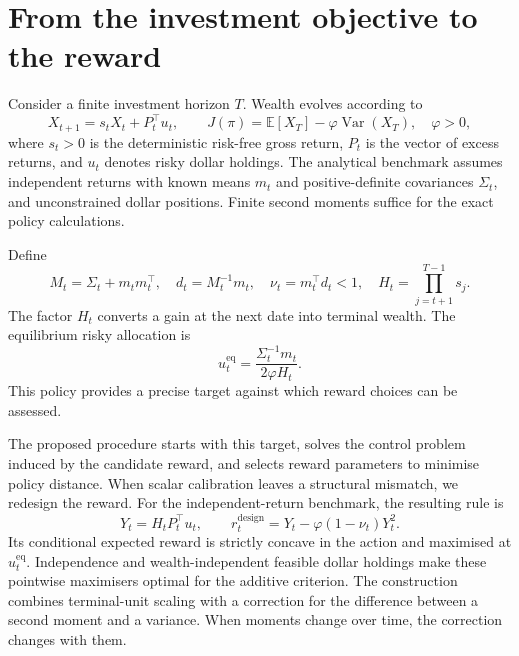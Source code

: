 \documentclass[11pt,a4paper]{article}
\theoremstyle{plain}
\theoremstyle{definition}
\newcommand{\E}{\mathbb{E}}
\newcommand{\Var}{\operatorname{Var}}
\begin{document}
\section{From the investment objective to the reward}
Consider a finite investment horizon $T$. Wealth evolves according to
\begin{equation}
 X_{t+1}=s_tX_t+P_t^{\top}u_t,\qquad
 J(\pi)=\E[X_T]-\varphi\Var(X_T),\quad\varphi>0,
\end{equation}
where $s_t>0$ is the deterministic risk-free gross return, $P_t$ is the vector of excess returns, and $u_t$ denotes risky dollar holdings. The analytical benchmark assumes independent returns with known means $m_t$ and positive-definite covariances $\Sigma_t$, and unconstrained dollar positions. Finite second moments suffice for the exact policy calculations.

Define
\begin{equation}
 M_t=\Sigma_t+m_tm_t^{\top},\quad d_t=M_t^{-1}m_t,\quad
 \nu_t=m_t^{\top}d_t<1,\quad H_t=\prod_{j=t+1}^{T-1}s_j.
\end{equation}
The factor $H_t$ converts a gain at the next date into terminal wealth. The equilibrium risky allocation is
\begin{equation}
 u_t^{\mathrm{eq}}=\frac{\Sigma_t^{-1}m_t}{2\varphi H_t}.
\end{equation}
This policy provides a precise target against which reward choices can be assessed.

The proposed procedure starts with this target, solves the control problem induced by the candidate reward, and selects reward parameters to minimise policy distance. When scalar calibration leaves a structural mismatch, we redesign the reward. For the independent-return benchmark, the resulting rule is
\begin{equation}
 Y_t=H_tP_t^{\top}u_t,\qquad
 r_t^{\mathrm{design}}=Y_t-\varphi(1-\nu_t)Y_t^2.
\end{equation}
Its conditional expected reward is strictly concave in the action and maximised at $u_t^{\mathrm{eq}}$. Independence and wealth-independent feasible dollar holdings make these pointwise maximisers optimal for the additive criterion. The construction combines terminal-unit scaling with a correction for the difference between a second moment and a variance. When moments change over time, the correction changes with them.
\end{document}
